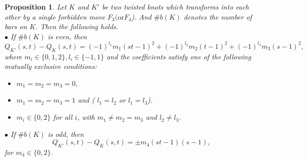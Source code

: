 \documentclass[10pt,a4paper]{amsart}
\newtheorem{proposition}{Proposition}
\begin{document}
	\begin{proposition}\label{pr:for3}
		Let $K$ and $K'$ be two twisted knots which transforms into each
		other by a single forbidden move $F_3(\text{or} F_4$).  And $\# b(K)$ denotes the number of bars on $K$. Then the following holds.\\
			$\bullet$ If $\#b(K)$ is even, then
			$$Q_{K'}(s,t)-Q_{K}(s,t)
			=(-1)^{l_{1}} m_{1}(st-1)^{2}+(-1)^{l_{2}} m_{2}(t-1)^{2}+(-1)^{l_{3}}m_{3}(s-1)^{2},
			$$
		where $m_i \in \{0,1,2\}, l_{i}\in \{-1,1\}$ and the
		coefficients satisfy one of the following mutually exclusive conditions:
		\begin{itemize}
			\item[(i)] $m_1=m_2=m_3=0$,
			\item[(ii)] $m_1=m_2=m_3=1$ and 
			( $l_1=l_2$ or $l_1=l_3$).
			\item[(iii)] $m_i\in\{0,2\}$ for all $i$, with $m_1\neq m_2=m_3$ and
			$l_2\neq l_3$.
		\end{itemize}
	$\bullet$ If $\# b(K)$ is odd, then
			$$Q_{K'}(s,t)-Q_{K}(s,t)=
			\pm m_{4}(st-1)(s-1),	$$
			for $m_{4}\in \{0,2\}$.
	\end{proposition}
\end{document}
